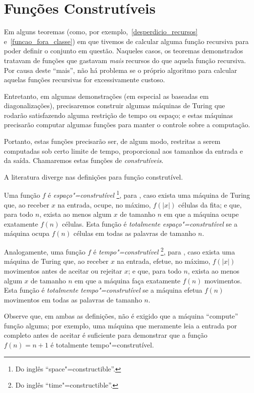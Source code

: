 \section{Funções Construtíveis}
\label{funcoes_construtiveis}

Em alguns teoremas
(como, por exemplo,~\ref{desperdicio_recursos} e~\ref{funcao_fora_classe})
em que tivemos de calcular alguma função recursiva
para poder definir o conjunto em questão.
Naqueles casos,
os teoremas demonstrados tratavam de funções
que gastavam \emph{mais} recursos do que aquela função recursiva.
Por causa deste ``mais'',
não há problema
se o próprio algoritmo para calcular aquelas funções recursivas
for excessivamente custoso.

Entretanto,
em algumas demonstrações
(em especial as baseadas em diagonalizações),
precisaremos construir algumas máquinas de Turing
que rodarão satisfazendo alguma restrição de tempo ou espaço;
e estas máquinas precisarão computar algumas funções
para manter o controle sobre a computação.

Portanto,
estas funções precisarão ser,
de algum modo,
restritas a serem computadas sob certo limite de tempo,
proporcional aos tamanhos da entrada e da saída.
Chamaremos estas funções de \emph{construtíveis}.

A literatura diverge nas definições para função construtível.

Uma função $f$ é \emph{espaço"=construtível}%
\footnote{
    Do inglês ``space"=constructible''.
},
para ,
caso exista uma máquina de Turing que,
ao receber $x$ na entrada,
ocupe, no máximo, $f(|x|)$ células da fita;
e que, para todo $n$, exista ao menos algum $x$ de tamanho $n$
em que a máquina ocupe exatamente $f(n)$ células.
Esta função é \emph{totalmente espaço"=construtível}
se a máquina ocupa $f(n)$ células em todas as palavras de tamanho $n$.

Analogamente, uma função $f$ é \emph{tempo"=construtível}%
\footnote{
    Do inglês ``time"=constructible''.
}, para
,
caso exista uma máquina de Turing que,
ao receber $x$ na entrada,
efetue, no máximo, $f(|x|)$ movimentos antes de aceitar ou rejeitar $x$;
e que, para todo $n$, exista ao menos algum $x$ de tamanho $n$
em que a máquina faça exatamente $f(n)$ movimentos.
Esta função é \emph{totalmente tempo"=construtível}
se a máquina efetua $f(n)$ movimentos em todas as palavras de tamanho $n$.

Observe que,
em ambas as definições,
não é exigido que a máquina ``compute'' função alguma;
por exemplo,
uma máquina que meramente leia a entrada por completo antes de aceitar
é suficiente para demonstrar que a função $f(n) = n+1$
é totalmente tempo"=construtível.

